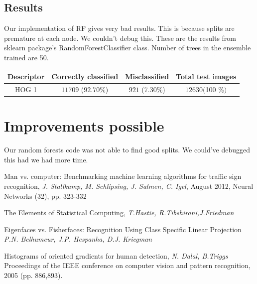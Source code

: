 \documentclass[a4paper]{article}
\begin{document}
\subsection{Results}
Our implementation of RF gives very bad results. This is because splits are premature at each node. We couldn't debug this. These are the results from sklearn package's RandomForestClassifier class. Number of trees in the ensemble trained are 50.
\begin{center}
\begin{tabular}{ |c|c|c|c| } 
 \hline
 Descriptor &Correctly classified & Misclassified & Total test images \\ 
 \hline
 HOG 1 &$11709$ ($  92.70 \%$) & $921$ ($7.30 \%$) & $12630 ($100 \%$)$ \\
 \hline
\end{tabular}
\end{center}

\section{Improvements possible}
Our random forests code was not able to find good splits. We could've debugged this had we had more time.


\begin{thebibliography}{4}
Man vs. computer: Benchmarking machine learning algorithms for traffic sign recognition, \emph{J. Stallkamp, M. Schlipsing, J. Salmen, C. Igel}, August 2012, Neural Networks (32), pp. 323-332

The Elements of Statistical Computing, \emph{T.Hastie, R.Tibshirani,J.Friedman}

Eigenfaces vs. Fisherfaces: Recognition Using Class Specific Linear Projection \emph{P.N. Belhumeur,  J.P. Hespanha, D.J. Kriegman}
 
Histograms of oriented gradients for human detection, \emph{N. Dalal, B.Triggs}  Proceedings of the IEEE conference on computer vision and pattern recognition, 2005 (pp. 886,893).

\end{thebibliography}
\end{document}
